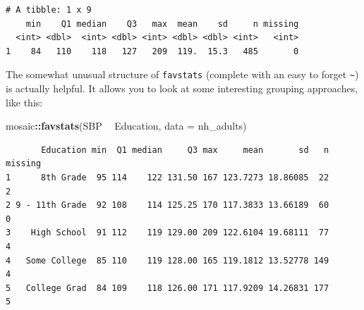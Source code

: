 \documentclass[
]{book}
\newenvironment{Shaded}{\begin{snugshade}}{\end{snugshade}}
\newcommand{\DataTypeTok}[1]{\textcolor[rgb]{0.13,0.29,0.53}{#1}}
\newcommand{\FloatTok}[1]{\textcolor[rgb]{0.00,0.00,0.81}{#1}}
\newcommand{\KeywordTok}[1]{\textcolor[rgb]{0.13,0.29,0.53}{\textbf{#1}}}
\newcommand{\NormalTok}[1]{#1}
\newcommand{\OperatorTok}[1]{\textcolor[rgb]{0.81,0.36,0.00}{\textbf{#1}}}
\newcommand{\StringTok}[1]{\textcolor[rgb]{0.31,0.60,0.02}{#1}}
\begin{document}
\begin{Shaded}
\end{Shaded}

\begin{verbatim}
# A tibble: 1 x 9
    min    Q1 median    Q3   max  mean    sd     n missing
  <int> <dbl>  <int> <dbl> <int> <dbl> <dbl> <int>   <int>
1    84   110    118   127   209  119.  15.3   485       0
\end{verbatim}

The somewhat unusual structure of \texttt{favstats} (complete with an easy to forget \texttt{\textasciitilde{}}) is actually helpful. It allows you to look at some interesting grouping approaches, like this:

\begin{Shaded}
\begin{Highlighting}[]
\NormalTok{mosaic}\OperatorTok{::}\KeywordTok{favstats}\NormalTok{(SBP }\OperatorTok{~}\StringTok{ }\NormalTok{Education, }\DataTypeTok{data =}\NormalTok{ nh_adults)}
\end{Highlighting}
\end{Shaded}

\begin{verbatim}
       Education min  Q1 median     Q3 max     mean       sd   n missing
1      8th Grade  95 114    122 131.50 167 123.7273 18.86085  22       2
2 9 - 11th Grade  92 108    114 125.25 170 117.3833 13.66189  60       0
3    High School  91 112    119 129.00 209 122.6104 19.68111  77       4
4   Some College  85 110    119 128.00 165 119.1812 13.52778 149       4
5   College Grad  84 109    118 126.00 171 117.9209 14.26831 177       5
\end{verbatim}
\end{document}
